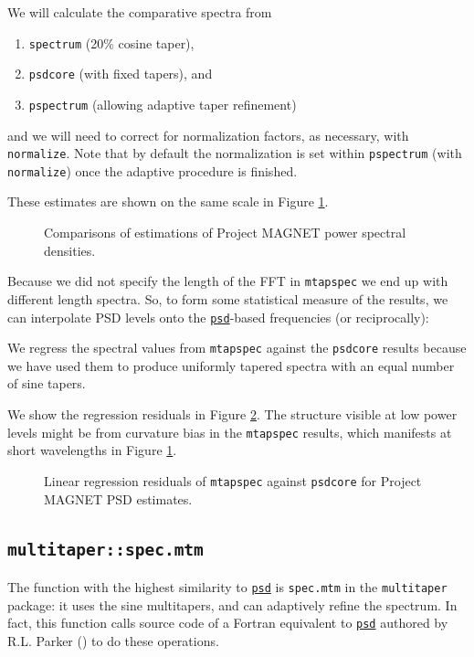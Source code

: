 \documentclass[10pt]{article}\usepackage[]{graphicx}\usepackage[]{color}
\newcommand{\Rcmd}[1]{\texttt{#1}}
\newcommand{\psd}[0]{\href{http://www.github.com/abarbour/psd/}{\color{blue}\Rcmd{psd}}}
\begin{document}
We will calculate the comparative spectra from
\begin{enumerate}
  \item \Rcmd{spectrum} (20\% cosine taper),
  \item \Rcmd{psdcore} (with fixed tapers), and
  \item \Rcmd{pspectrum} (allowing adaptive taper refinement)
\end{enumerate}
and we will need to correct for normalization factors, as necessary, with
\Rcmd{normalize}. Note that by default the normalization is
set within \Rcmd{pspectrum} (with \Rcmd{normalize}) once the adaptive procedure
is finished.


These estimates are shown on the same scale in Figure \ref{fig:psdcomp}.

\begin{figure}[!htbp]
\begin{center}

\caption{Comparisons of estimations of Project MAGNET power spectral densities.}
\label{fig:psdcomp}
\end{center}
\end{figure}

\clearpage

Because we did not specify the length of the FFT in \Rcmd{mtapspec}
we end up with different length spectra.  So, to form some statistical measure
of the results, we can interpolate PSD levels onto the \psd{}-based frequencies
(or reciprocally): 

We regress the spectral values from \Rcmd{mtapspec} against
the \Rcmd{psdcore} results because we have used them to produce uniformly tapered spectra
with an equal number of sine tapers.

We show the regression residuals in Figure \ref{fig:psdreg}.  
The structure visible at low power levels might be from curvature bias in
the \Rcmd{mtapspec} results, which manifests at short wavelengths
in Figure \ref{fig:psdcomp}.

\begin{figure}[!htbp]
\begin{center}

\caption{Linear regression residuals of
\Rcmd{mtapspec} against \Rcmd{psdcore} for Project MAGNET PSD estimates.}
\label{fig:psdreg}
\end{center}
\end{figure}

\clearpage

\subsection{\Rcmd{multitaper::spec.mtm}}
The function with the highest similarity to \psd{} is
\Rcmd{spec.mtm} in the \Rcmd{multitaper} package: it uses
the sine multitapers, and can adaptively refine the spectrum.
In fact, this function calls source code of a Fortran equivalent to \psd{}
authored by R.L. Parker (\citeyear{parkerweb}) to do these operations.
\end{document}
